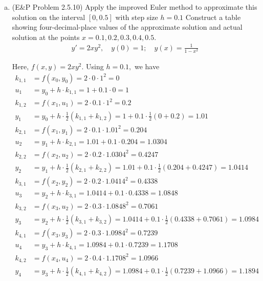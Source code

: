 \documentclass{article}
\begin{document}
\begin{enumerate}
\begin{enumerate}[(a)]
			\item (E\&P Problem 2.5.10) Apply the improved Euler method to approximate this solution on the interval $[0, 0.5]$ with step size $h=0.1$ Construct a table showing four-decimal-place values of the approximate solution and actual solution at the points $x=0.1, 0.2, 0.3, 0.4, 0.5.$
				\begin{align*}
					y'=2xy^2, \quad y(0)=1; \quad y(x)=\frac{1}{1-x^2}
				\end{align*}
				\begin{soln}
					Here, $f(x, y)=2xy^2.$ Using $h=0.1,$ we have
					\begin{align*}
						k_{1, 1} &= f(x_0, y_0) = 2\cdot 0\cdot 1^2 = 0 \\
						u_1 &= y_0 + h\cdot k_{1, 1} = 1 + 0.1\cdot 0 = 1 \\
						k_{1, 2} &= f(x_1, u_1) = 2\cdot 0.1\cdot 1^2 = 0.2 \\
						y_1 &= y_0 + h\cdot \frac{1}{2}\left( k_{1, 1}+k_{1, 2} \right) = 1 + 0.1\cdot \frac{1}{2}(0+0.2) = 1.01 \\
						k_{2, 1} &= f(x_1, y_1) = 2\cdot 0.1\cdot 1.01^2 = 0.204 \\
						u_2 &= y_1 + h\cdot k_{2, 1} = 1.01 + 0.1\cdot 0.204 = 1.0304 \\
						k_{2, 2} &= f(x_2, u_2) = 2\cdot 0.2\cdot 1.0304^2 = 0.4247 \\
						y_2 &= y_1 + h\cdot \frac{1}{2}\left( k_{2, 1} + k_{2, 2} \right) = 1.01 + 0.1\cdot \frac{1}{2}\left( 0.204+0.4247 \right) = 1.0414 \\
						k_{3, 1} &= f(x_2, y_2) = 2\cdot 0.2\cdot 1.0414^2 = 0.4338 \\
						u_3 &= y_2 + h\cdot k_{3, 1} = 1.0414+0.1\cdot 0.4338 = 1.0848 \\
						k_{3, 2} &= f(x_3, u_2) = 2\cdot 0.3\cdot 1.0848^2 = 0.7061 \\
						y_3 &= y_2 + h\cdot \frac{1}{2}\left( k_{3, 1} + k_{3, 2} \right) = 1.0414 + 0.1\cdot \frac{1}{2}\left( 0.4338 + 0.7061 \right) = 1.0984 \\
						k_{4, 1} &= f(x_3, y_3) = 2\cdot 0.3\cdot 1.0984^2 = 0.7239 \\
						u_4 &= y_3 + h\cdot k_{4, 1} = 1.0984 + 0.1\cdot 0.7239 = 1.1708 \\
						k_{4, 2} &= f(x_4, u_4) = 2\cdot 0.4\cdot 1.1708^2 = 1.0966 \\
						y_4 &= y_3 + h\cdot \frac{1}{2}\left( k_{4, 1} + k_{4, 2} \right) = 1.0984 + 0.1\cdot \frac{1}{2}\left( 0.7239 + 1.0966 \right) = 1.1894 \\

\end{align*}
\end{soln}
\end{enumerate}
\end{enumerate}
\end{document}
